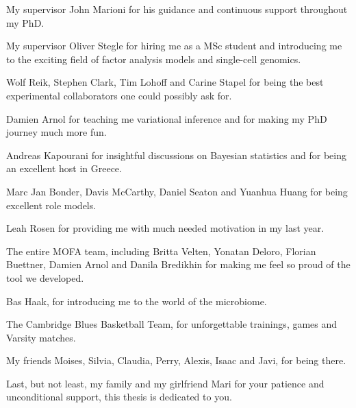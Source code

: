 
\begin{acknowledgements}

My supervisor John Marioni for his guidance and continuous support throughout my PhD.

My supervisor Oliver Stegle for hiring me as a MSc student and introducing me to the exciting field of factor analysis models and single-cell genomics. 

Wolf Reik, Stephen Clark, Tim Lohoff and Carine Stapel for being the best experimental collaborators one could possibly ask for. 

Damien Arnol for teaching me variational inference and for making my PhD journey much more fun.

Andreas Kapourani for insightful discussions on Bayesian statistics and for being an excellent host in Greece. 

Marc Jan Bonder, Davis McCarthy, Daniel Seaton and Yuanhua Huang for being excellent role models.

Leah Rosen for providing me with much needed motivation in my last year.

The entire MOFA team, including Britta Velten, Yonatan Deloro, Florian Buettner, Damien Arnol and Danila Bredikhin for making me feel so proud of the tool we developed.

Bas Haak, for introducing me to the world of the microbiome.

The Cambridge Blues Basketball Team, for unforgettable trainings, games and Varsity matches.

My friends Moises, Silvia, Claudia, Perry, Alexis, Isaac and Javi, for being there.

Last, but not least, my family and my girlfriend Mari for your patience and unconditional support, this thesis is dedicated to you.

\end{acknowledgements}
